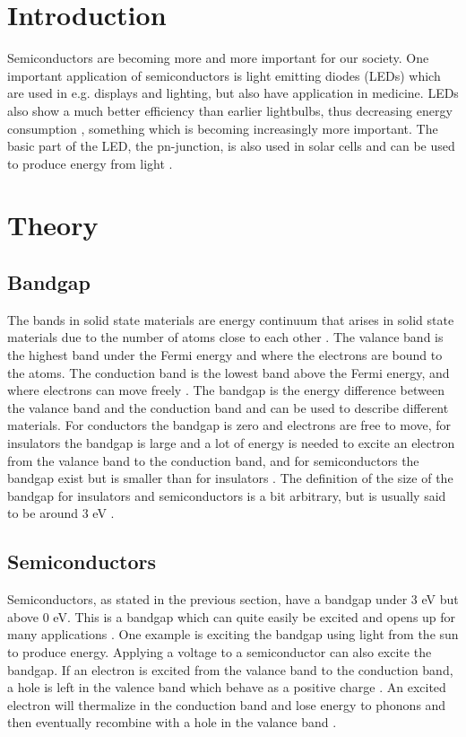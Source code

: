 \section{Introduction}
Semiconductors are becoming more and more important for our society. One important application of semiconductors is light emitting diodes (LEDs) \cite{hofmann2015} which are used in e.g. displays and lighting, but also have application in medicine. LEDs also show a much better efficiency than earlier lightbulbs, thus decreasing energy consumption \cite{hofmann2015}, something which is becoming increasingly more important. The basic part of the LED, the pn-junction, is also used in solar cells and can be used to produce energy from light \cite{hofmann2015}.

\section{Theory}
\subsection{Bandgap}
The bands in solid state materials are energy continuum that arises in solid state materials due to the number of atoms close to each other \cite{hofmann2015}. The valance band is the highest band under the Fermi energy and where the electrons are bound to the atoms. The conduction band is the lowest band above the Fermi energy, and where electrons can move freely \cite{hofmann2015}. The bandgap is the energy difference between the valance band and the conduction band and can be used to describe different materials. For conductors the bandgap is zero and electrons are free to move, for insulators the bandgap is large and a lot of energy is needed to excite an electron from the valance band to the conduction band, and for semiconductors the bandgap exist but is smaller than for insulators \cite{hofmann2015}. The definition of the size of the bandgap for insulators and semiconductors is a bit arbitrary, but is usually said to be around 3 eV \cite{hofmann2015}.

\subsection{Semiconductors}
Semiconductors, as stated in the previous section, have a bandgap under 3 eV but above 0 eV. This is a bandgap which can quite easily be excited and opens up for many applications \cite{hofmann2015}. One example is exciting the bandgap using light from the sun to produce energy. Applying a voltage to a semiconductor can also excite the bandgap. If an electron is excited from the valance band to the conduction band, a hole is left in the valence band which behave as a positive charge \cite{hofmann2015}. An excited electron will thermalize in the conduction band and lose energy to phonons and then eventually recombine with a hole in the valance band \cite{hofmann2015}.


